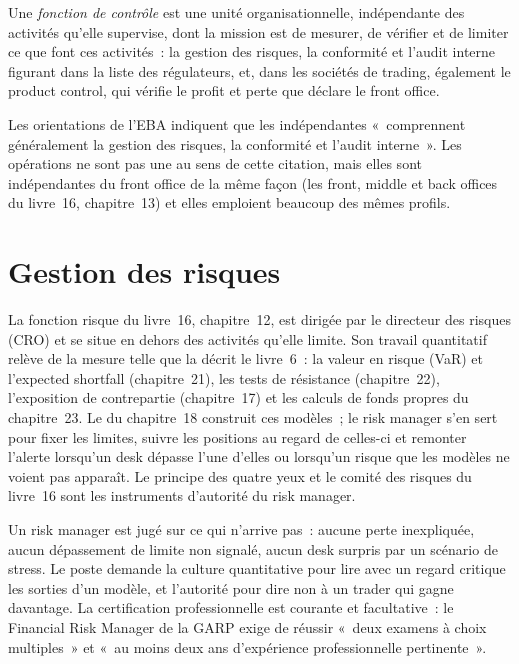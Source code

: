 \begin{definition}\label{def:in:risk-operations-product-control-and-compliance:control}
Une \emph{fonction de contrôle} est une unité organisationnelle, indépendante des activités qu'elle
supervise, dont la mission est de mesurer, de vérifier et de limiter ce que font ces activités~: la gestion des risques, la conformité et l'audit
interne figurant dans la liste des régulateurs, et, dans les sociétés de trading, également le product control, qui vérifie le profit et perte que déclare le front
office.
\end{definition}

Les orientations de l'EBA indiquent que les  indépendantes «~comprennent généralement la gestion des risques, la conformité et l'audit
interne~». Les opérations ne sont pas une  au sens de cette citation, mais elles sont indépendantes du front office de la
même façon (les front, middle et back offices du livre~16, chapitre~13) et elles emploient beaucoup des mêmes profils.

\section{Gestion des risques}

La fonction risque du livre~16, chapitre~12, est dirigée par le directeur des risques (CRO) et se situe en dehors des activités qu'elle limite.
Son travail quantitatif relève de la mesure telle que la décrit le livre~6~: la valeur en risque (VaR) et l'expected shortfall (chapitre~21), les tests de résistance
(chapitre~22), l'exposition de contrepartie (chapitre~17) et les calculs de fonds propres du chapitre~23. Le  du
chapitre~18 construit ces modèles~; le risk manager s'en sert pour fixer les limites, suivre les positions au regard de celles-ci et remonter l'alerte
lorsqu'un desk dépasse l'une d'elles ou lorsqu'un risque que les modèles ne voient pas apparaît. Le principe des quatre yeux et le comité des risques du
livre~16 sont les instruments d'autorité du risk manager.

Un risk manager est jugé sur ce qui n'arrive pas~: aucune perte inexpliquée, aucun dépassement de limite non signalé, aucun desk surpris par un scénario de
stress. Le poste demande la culture quantitative pour lire avec un regard critique les sorties d'un modèle, et l'autorité pour dire non à un
trader qui gagne davantage. La certification professionnelle est courante et facultative~: le Financial Risk Manager de la GARP exige de réussir
«~deux examens à choix multiples~» et «~au moins deux ans d'expérience professionnelle pertinente~».

